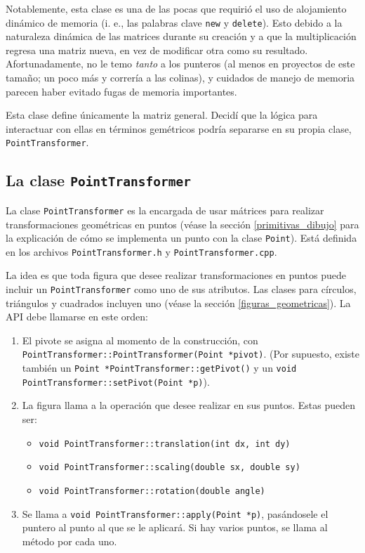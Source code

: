 Notablemente, esta clase es una de las pocas que requirió el uso de alojamiento dinámico de
memoria (i. e., las palabras clave \lstinline!new! y \lstinline!delete!). Esto
debido a la naturaleza dinámica de las matrices durante su creación y a que la multiplicación
regresa una matriz nueva, en vez de modificar otra como su resultado. Afortunadamente,
no le temo \emph{tanto} a los punteros (al menos en proyectos de este tamaño; un poco
más y correría a las colinas), y cuidados de manejo de memoria parecen haber evitado
fugas de memoria importantes.

Esta clase define únicamente la matriz general. Decidí que la lógica para interactuar
con ellas en términos gemétricos podría separarse en su propia clase, \lstinline!PointTransformer!.

\subsection{La clase \lstinline!PointTransformer!}

La clase \lstinline!PointTransformer! es la encargada de usar mátrices para realizar
transformaciones geométricas en puntos (véase la sección \ref{primitivas_dibujo} para la explicación
de cómo se implementa un punto con la clase \lstinline!Point!). Está definida en los
archivos \lstinline!PointTransformer.h! y \lstinline!PointTransformer.cpp!.

La idea es que toda figura que desee realizar transformaciones en puntos puede incluir un
\lstinline!PointTransformer! como uno de sus atributos. Las clases para círculos,
triángulos y cuadrados incluyen uno (véase la sección \ref{figuras_geometricas}). La API debe llamarse
en este orden:
\begin{enumerate}
	\item El pivote se asigna al momento de la construcción, con
	\lstinline!PointTransformer::PointTransformer(Point *pivot)!. (Por supuesto,
	existe también un \lstinline!Point *PointTransformer::getPivot()! y un \lstinline!void PointTransformer::setPivot(Point *p)!).
	\item La figura llama a la operación que desee realizar en sus puntos. Estas pueden
	ser:
	\begin{itemize}
		\item \lstinline!void PointTransformer::translation(int dx, int dy)!
		\item \lstinline!void PointTransformer::scaling(double sx, double sy)!
		\item \lstinline!void PointTransformer::rotation(double angle)!
	\end{itemize}
	\item Se llama a \lstinline!void PointTransformer::apply(Point *p)!, pasándosele
	el puntero al punto al que se le aplicará. Si hay varios puntos, se llama
	al método por cada uno.
\end{enumerate}

